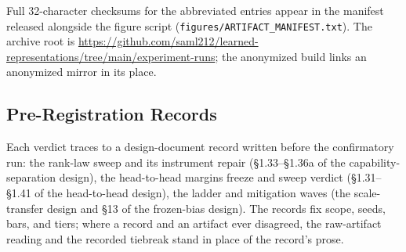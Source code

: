 Full 32-character checksums for the abbreviated entries appear in the
manifest released alongside the figure script
(\texttt{figures/ARTIFACT\_MANIFEST.txt}). The archive root is
\url{https://github.com/saml212/learned-representations/tree/main/experiment-runs};
the anonymized build links an anonymized mirror in its place.

\subsection{Pre-Registration Records}

Each verdict traces to a design-document record written before the
confirmatory run: the rank-law sweep and its instrument repair
(\S1.33--\S1.36a of the capability-separation design), the head-to-head
margins freeze and sweep verdict (\S1.31--\S1.41 of the head-to-head
design), the ladder and mitigation waves (the scale-transfer design and
\S13 of the frozen-bias design). The records fix scope, seeds, bars, and
tiers; where a record and an artifact ever disagreed, the raw-artifact
reading and the recorded tiebreak stand in place of the record's prose.

